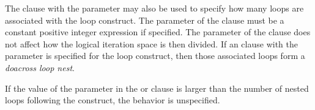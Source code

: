 The  clause with the parameter may also be used to specify 
how many loops are associated with the loop construct. The parameter of 
the  clause must be a constant positive integer expression
if specified. The parameter of the  clause does not
affect how the logical iteration space is then divided. If an  
clause with the parameter is specified for the loop construct, then those 
associated loops form a \emph{doacross loop nest}. 

If the value of the parameter in the  or  
clause is larger than the number of nested loops following the construct, 
the behavior is unspecified.

\vspace{1ex}\renewcommand{\arraystretch}{1.5}
\tablefirsthead{%
\hline\\[-3ex]
}
\tablelasttail{\hline}
